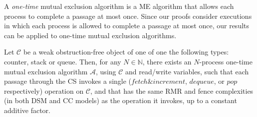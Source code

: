 	A \emph{one-time} mutual exclusion algorithm is a ME algorithm that allows each process to complete a passage at most once. Since our proofs consider executions in which each process is allowed to complete a passage at most once, our results can be applied to one-time mutual exclusion algorithms.
	
	\begin{lemma} \label{lem: ME-using-object}
		Let $\mathcal{C}$ be a weak obstruction-free object of one of one the following types: counter, stack or queue. Then, for any $N \in \mathbb{N}$, there exists an $N$-process one-time mutual exclusion algorithm $\mathcal{A}$, using $\mathcal{C}$ and read/write variables, such that each passage through the CS invokes a single ($fetch \& increment$, $dequeue$, or $pop$ respectively) operation on $\mathcal{C}$, and that has the same RMR and fence complexities (in both DSM and CC models) as the operation it invokes, up to a constant additive factor.
	\end{lemma}
	
